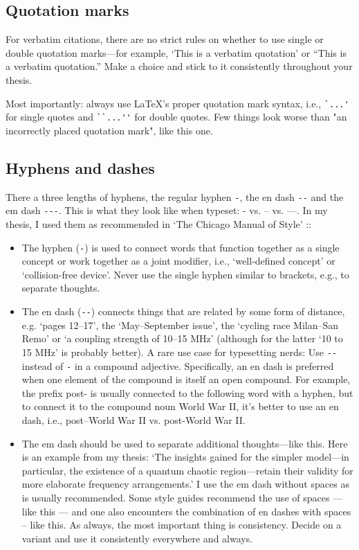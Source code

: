 \subsection{Quotation marks}
For verbatim citations, there are no strict rules on whether to use single or double quotation marks—for example, `This is a verbatim quotation' or ``This is a verbatim quotation.'' Make a choice and stick to it consistently throughout your thesis.

Most importantly: always use LaTeX's proper quotation mark syntax, i.e., \verb|`...'| for single quotes and \verb|``...''| for double quotes. Few things look worse than "an incorrectly placed quotation mark", like this one.

\subsection{Hyphens and dashes}
There a three lengths of hyphens, the regular hyphen \verb|-|, the en dash \verb|--| and the em dash \verb|---|.
This is what they look like when typeset: - vs. -- vs. ---.
In my thesis, I used them as recommended in `The Chicago Manual of Style' \cite{chicagoMOS}::
\begin{itemize}
\item The hyphen (\verb|-|) is used to connect words that function together as a single concept or work together as a joint modifier, i.e., `well-defined concept' or `collision-free device'. Never use the single hyphen similar to brackets, e.g., to separate thoughts.
\item The en dash (\verb|--|) connects things that are related by some form of distance, e.g. `pages 12--17', the `May--September issue', the `cycling race Milan--San Remo' or `a coupling strength of 10--15 MHz' (although for the latter `10 to 15 MHz' is probably better). A rare use case for typesetting nerds: Use \verb|--| instead of \verb|-| in a compound adjective. Specifically, an en dash is preferred when one element of the compound is itself an open compound. For example, the prefix post- is usually connected to the following word with a hyphen, but to connect it to the compound noun World War II, it's better to use an en dash, i.e., post--World War II vs. post-World War II.
\item The em dash should be used to separate additional thoughts---like this. Here is an example from my thesis: `The insights gained for the simpler model---in particular, the existence of a quantum chaotic region---retain their validity for more elaborate frequency arrangements.' I use the em dash without spaces as is usually recommended. Some style guides recommend the use of spaces --- like this --- and one also encounters the combination of en dashes with spaces -- like this. As always, the most important thing is consistency. Decide on a variant and use it consistently everywhere and always.
\end{itemize}

